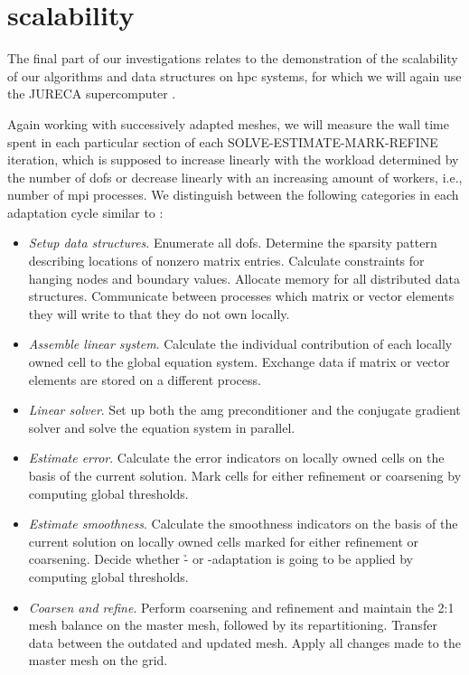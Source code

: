 \section{ scalability}
\label{sec:scaling}

The final part of our investigations relates to the demonstration of the scalability of our algorithms and data structures on \gls{hpc} systems, for which we will again use the JURECA supercomputer \parencite{krause2018,jureca}.

Again working with successively adapted meshes, we will measure the wall time spent in each particular section of each SOLVE-ESTIMATE-MARK-REFINE iteration, which is supposed to increase linearly with the workload determined by the number of \glspl{dof} or decrease linearly with an increasing amount of workers, i.e., number of \gls{mpi} processes. We distinguish between the following categories in each adaptation cycle similar to \textcite{bangerth2012}:
\begin{itemize}
\item \textit{Setup data structures}. Enumerate all \glspl{dof}. Determine the sparsity pattern describing locations of nonzero matrix entries. Calculate constraints for hanging nodes and boundary values. Allocate memory for all distributed data structures. Communicate between processes which matrix or vector elements they will write to that they do not own locally.
\item \textit{Assemble linear system}. Calculate the individual contribution of each locally owned cell to the global equation system. Exchange data if matrix or vector elements are stored on a different process.
\item \textit{Linear solver}. Set up both the \gls{amg} preconditioner and the conjugate gradient solver and solve the equation system in parallel.
\item \textit{Estimate error}. Calculate the error indicators on locally owned cells on the basis of the current solution. Mark cells for either refinement or coarsening by computing global thresholds.
\item \textit{Estimate smoothness}. Calculate the smoothness indicators on the basis of the current solution on locally owned cells marked for either refinement or coarsening. Decide whether \h- or \p-adaptation is going to be applied by computing global thresholds.
\item \textit{Coarsen and refine}. Perform coarsening and refinement and maintain the 2:1 mesh balance on the \pforest{} master mesh, followed by its repartitioning. Transfer data between the outdated and updated mesh. Apply all changes made to the master mesh on the \dealii{} grid.
\end{itemize}

